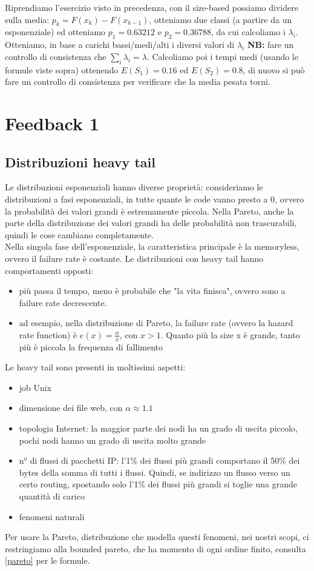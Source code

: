 \documentclass{article}
\begin{document}
Riprendiamo l'esercizio visto in precedenza, con il size-based possiamo dividere sulla media: $p_k = F(x_k) - F(x_{k-1})$, otteniamo due classi (a partire da un esponenziale) ed otteniamo $p_1 = 0.63212$ e $p_2 = 0.36788$, da cui calcoliamo i $\lambda_i$. Otteniamo, in base a carichi bassi/medi/alti i diversi valori di $\lambda_i$ \textbf{NB: }fare un controllo di consistenza che $\sum\limits_{i} \lambda_i = \lambda$. Calcoliamo poi i tempi medi (usando le formule viste sopra) ottenendo $E(S_1) = 0.16$ ed $E(S_2) = 0.8$, di nuovo si può fare un controllo di consistenza per verificare che la media pesata torni.







\section{Feedback 1}
\subsection{Distribuzioni heavy tail}
Le distribuzioni esponenziali hanno diverse proprietà: consideriamo le distribuzioni a fasi esponenziali, in tutte quante le code vanno presto a 0, ovvero la probabilità dei valori grandi è estremamente piccola. Nella Pareto, anche la parte della distribuzione dei valori grandi ha delle probabilità non trascurabili, quindi le cose cambiano completamente.\\ Nella singola fase dell'esponenziale, la caratteristica principale è la memoryless, ovvero il failure rate è costante. Le distribuzioni con heavy tail hanno comportamenti opposti:
\begin{itemize}
\item più passa il tempo, meno è probabile che "la vita finisca", ovvero sono a failure rate decrescente.
\item ad esempio, nella distribuzione di Pareto, la failure rate (ovvero la hazard rate function) è $e(x) = \frac{\alpha}{x}$, con $x > 1$. Quanto più la size x è grande, tanto più è piccola la frequenza di fallimento
\end{itemize}
Le heavy tail sono presenti in moltissimi aspetti:
\begin{itemize}
\item job Unix
\item dimensione dei file web, con $\alpha \approx 1.1$
\item topologia Internet: la maggior parte dei nodi ha un grado di uscita piccolo, pochi nodi hanno un grado di uscita molto grande
\item n° di flussi di pacchetti IP: l'1\% dei flussi più grandi comportano il 50\% dei bytes della somma di tutti i flussi. Quindi, se indirizzo un flusso verso un certo routing, spostando solo l'1\% dei flussi più grandi si toglie una grande quantità di carico
\item fenomeni naturali
\end{itemize}
Per usare la Pareto, distribuzione che modella questi fenomeni, nei nostri scopi, ci restringiamo alla bounded pareto, che ha momento di ogni ordine finito, consulta \ref{pareto} per le formule.
\end{document}
